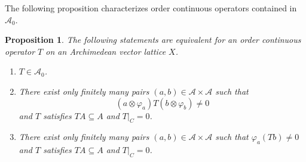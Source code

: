 \documentclass[12pt,reqno]{amsart}
\theoremstyle{plain}
\newtheorem{proposition}[theorem]{Proposition}
\theoremstyle{definition}
\begin{document}
The following proposition characterizes order continuous operators contained in $\mathscr A_0$.

\begin{proposition}\label{aabb}
The following statements are equivalent for an order continuous operator $T$ on an Archimedean vector lattice $X$.
\begin{enumerate}
  \item $T\in \mathscr A_0$.
  \item There exist only finitely many pairs $(a,b)\in \mathcal A\times \mathcal A$ such that
$$(a\otimes \varphi_a)T(b\otimes \varphi_b)\neq 0$$
and $T$ satisfies $TA\subseteq A$ and $T|_C=0$.
\item There exist only finitely many pairs $(a,b)\in \mathcal A\times \mathcal A$ such that
$\varphi_a(Tb)\neq 0$ and $T$ satisfies $TA\subseteq A$ and $T|_C=0$. 
\end{enumerate}
\end{proposition}
\end{document}
